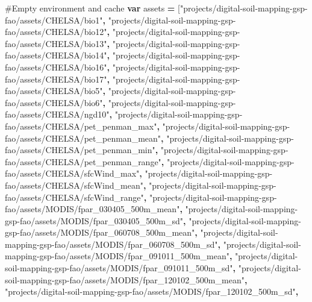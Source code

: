 \documentclass[
  10pt,
  b5paper,
  oneside]{book}
\newenvironment{Shaded}{\begin{snugshade}}{\end{snugshade}}
\newcommand{\KeywordTok}[1]{\textcolor[rgb]{0.13,0.29,0.53}{\textbf{#1}}}
\newcommand{\NormalTok}[1]{#1}
\newcommand{\OperatorTok}[1]{\textcolor[rgb]{0.81,0.36,0.00}{\textbf{#1}}}
\newcommand{\StringTok}[1]{\textcolor[rgb]{0.31,0.60,0.02}{#1}}
\begin{document}
\begin{Shaded}
\begin{Highlighting}[]
\NormalTok{\#Empty environment and cache}
\KeywordTok{var}\NormalTok{ assets }\OperatorTok{=} 
\NormalTok{[}\StringTok{"projects/digital{-}soil{-}mapping{-}gsp{-}fao/assets/CHELSA/bio1"}\OperatorTok{,}
\StringTok{"projects/digital{-}soil{-}mapping{-}gsp{-}fao/assets/CHELSA/bio12"}\OperatorTok{,}
\StringTok{"projects/digital{-}soil{-}mapping{-}gsp{-}fao/assets/CHELSA/bio13"}\OperatorTok{,}
\StringTok{"projects/digital{-}soil{-}mapping{-}gsp{-}fao/assets/CHELSA/bio14"}\OperatorTok{,}
\StringTok{"projects/digital{-}soil{-}mapping{-}gsp{-}fao/assets/CHELSA/bio16"}\OperatorTok{,}
\StringTok{"projects/digital{-}soil{-}mapping{-}gsp{-}fao/assets/CHELSA/bio17"}\OperatorTok{,}
\StringTok{"projects/digital{-}soil{-}mapping{-}gsp{-}fao/assets/CHELSA/bio5"}\OperatorTok{,}
\StringTok{"projects/digital{-}soil{-}mapping{-}gsp{-}fao/assets/CHELSA/bio6"}\OperatorTok{,}
\StringTok{"projects/digital{-}soil{-}mapping{-}gsp{-}fao/assets/CHELSA/ngd10"}\OperatorTok{,}
\StringTok{"projects/digital{-}soil{-}mapping{-}gsp{-}fao/assets/CHELSA/pet\_penman\_max"}\OperatorTok{,}
\StringTok{"projects/digital{-}soil{-}mapping{-}gsp{-}fao/assets/CHELSA/pet\_penman\_mean"}\OperatorTok{,}
\StringTok{"projects/digital{-}soil{-}mapping{-}gsp{-}fao/assets/CHELSA/pet\_penman\_min"}\OperatorTok{,}
\StringTok{"projects/digital{-}soil{-}mapping{-}gsp{-}fao/assets/CHELSA/pet\_penman\_range"}\OperatorTok{,}
\StringTok{"projects/digital{-}soil{-}mapping{-}gsp{-}fao/assets/CHELSA/sfcWind\_max"}\OperatorTok{,}
\StringTok{"projects/digital{-}soil{-}mapping{-}gsp{-}fao/assets/CHELSA/sfcWind\_mean"}\OperatorTok{,}
\StringTok{"projects/digital{-}soil{-}mapping{-}gsp{-}fao/assets/CHELSA/sfcWind\_range"}\OperatorTok{,}
\StringTok{"projects/digital{-}soil{-}mapping{-}gsp{-}fao/assets/MODIS/fpar\_030405\_500m\_mean"}\OperatorTok{,}
\StringTok{"projects/digital{-}soil{-}mapping{-}gsp{-}fao/assets/MODIS/fpar\_030405\_500m\_sd"}\OperatorTok{,}
\StringTok{"projects/digital{-}soil{-}mapping{-}gsp{-}fao/assets/MODIS/fpar\_060708\_500m\_mean"}\OperatorTok{,}
\StringTok{"projects/digital{-}soil{-}mapping{-}gsp{-}fao/assets/MODIS/fpar\_060708\_500m\_sd"}\OperatorTok{,}
\StringTok{"projects/digital{-}soil{-}mapping{-}gsp{-}fao/assets/MODIS/fpar\_091011\_500m\_mean"}\OperatorTok{,}
\StringTok{"projects/digital{-}soil{-}mapping{-}gsp{-}fao/assets/MODIS/fpar\_091011\_500m\_sd"}\OperatorTok{,}
\StringTok{"projects/digital{-}soil{-}mapping{-}gsp{-}fao/assets/MODIS/fpar\_120102\_500m\_mean"}\OperatorTok{,}
\StringTok{"projects/digital{-}soil{-}mapping{-}gsp{-}fao/assets/MODIS/fpar\_120102\_500m\_sd"}\OperatorTok{,}

\end{Highlighting}
\end{Shaded}
\end{document}
